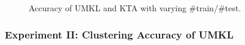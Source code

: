 \begin{figure}[!t]
\begin{center}
\caption{Accuracy of UMKL and KTA with varying \#train/\#test. }
\end{center}
\end{figure}

\subsubsection{Experiment II: Clustering Accuracy of UMKL}

